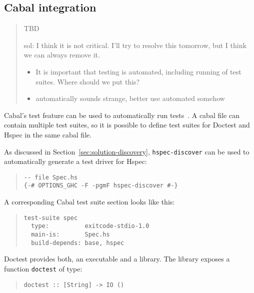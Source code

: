 \documentclass[preprint]{sigplanconf}
\begin{document}
\subsection{Cabal integration}

\begin{quote}
    TBD

    sol: I think it is not critical.  I'll try to resolve this
    tomorrow, but I think we can always remove it.

\begin{itemize}

\item It is important that testing is automated, including running of test
    suites.  Where should we put this?

\item automatically sounds strange, better use automated somehow
\end{itemize}
\end{quote}

\noindent Cabal's test feature can be used to automatically run tests~\cite{cabal}.  A cabal
file can contain multiple test suites, so it is possible to define test suites
for Doctest and Hspec in the same cabal file.

As discussed in Section~\ref{sec:solution-discovery},
{\tt hspec-discover} can be used to automatically generate a test
driver for Hspec:

\begin{quote}
\small
\begin{verbatim}
-- file Spec.hs
{-# OPTIONS_GHC -F -pgmF hspec-discover #-}
\end{verbatim}
\end{quote}

\noindent A corresponding Cabal test suite section looks like this:

\begin{quote}
\small
\begin{verbatim}
test-suite spec
  type:          exitcode-stdio-1.0
  main-is:       Spec.hs
  build-depends: base, hspec
\end{verbatim}
\end{quote}

\noindent Doctest provides both, an executable and a library.  The library
exposes a function \verb|doctest| of type:


\begin{quote}
\small
\begin{verbatim}
doctest :: [String] -> IO ()
\end{verbatim}
\end{quote}
\end{document}
